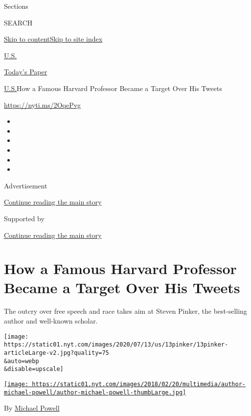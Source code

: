 Sections

SEARCH

\protect\hyperlink{site-content}{Skip to
content}\protect\hyperlink{site-index}{Skip to site index}

\href{https://www.nytimes.com/section/us}{U.S.}

\href{https://myaccount.nytimes.com/auth/login?response_type=cookie\&client_id=vi}{}

\href{https://www.nytimes.com/section/todayspaper}{Today's Paper}

\href{/section/us}{U.S.}\textbar{}How a Famous Harvard Professor Became
a Target Over His Tweets

\url{https://nyti.ms/2OqePvg}

\begin{itemize}
\item
\item
\item
\item
\item
\item
\end{itemize}

Advertisement

\protect\hyperlink{after-top}{Continue reading the main story}

Supported by

\protect\hyperlink{after-sponsor}{Continue reading the main story}

\hypertarget{how-a-famous-harvard-professor-became-a-target-over-his-tweets}{%
\section{How a Famous Harvard Professor Became a Target Over His
Tweets}\label{how-a-famous-harvard-professor-became-a-target-over-his-tweets}}

The outcry over free speech and race takes aim at Steven Pinker, the
best-selling author and well-known scholar.

\texttt{[image: https://static01.nyt.com/images/2020/07/13/us/13pinker/13pinker-articleLarge-v2.jpg?quality=75\\\&auto=webp\\\&disable=upscale]}

\href{https://topics.nytimes.com/topics/reference/timestopics/people/p/michael_powell/index.html}{\texttt{[image: https://static01.nyt.com/images/2018/02/20/multimedia/author-michael-powell/author-michael-powell-thumbLarge.jpg]}}

By
\href{https://topics.nytimes.com/topics/reference/timestopics/people/p/michael_powell/index.html}{Michael
Powell}

